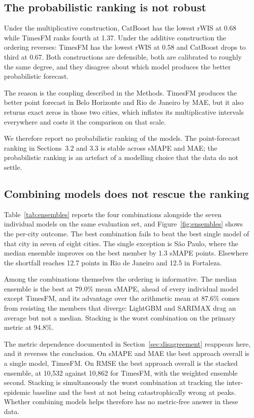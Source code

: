 \documentclass[11pt]{article}
\begin{document}
\subsection{The probabilistic ranking is not robust}

Under the multiplicative construction, CatBoost has the lowest rWIS at 0.68 while TimesFM
ranks fourth at 1.37. Under the additive construction the ordering reverses: TimesFM has
the lowest rWIS at 0.58 and CatBoost drops to third at 0.67. Both constructions are
defensible, both are calibrated to roughly the same degree, and they disagree about which
model produces the better probabilistic forecast.

The reason is the coupling described in the Methods. TimesFM produces the better point
forecast in Belo Horizonte and Rio de Janeiro by MAE, but it also returns exact zeros in
those two cities, which inflates its multiplicative intervals everywhere and costs it the
comparison on that scale.

We therefore report no probabilistic ranking of the models. The point-forecast ranking in
Sections~3.2 and 3.3 is stable across sMAPE and MAE; the probabilistic ranking is an
artefact of a modelling choice that the data do not settle.

\subsection{Combining models does not rescue the ranking}
\label{sec:ensembles}

Table~\ref{tab:ensembles} reports the four combinations alongside the seven individual
models on the same evaluation set, and Figure~\ref{fig:ensembles} shows the per-city
outcome. The best combination fails to beat the best single model of that city in seven of
eight cities. The single exception is S\~ao Paulo, where the median ensemble improves on
the best member by 1.3 sMAPE points. Elsewhere the shortfall reaches 12.7 points in Rio de
Janeiro and 12.5 in Fortaleza.

Among the combinations themselves the ordering is informative. The median ensemble is the
best at 79.0\% mean sMAPE, ahead of every individual model except TimesFM, and its
advantage over the arithmetic mean at 87.6\% comes from resisting the members that
diverge: LightGBM and SARIMAX drag an average but not a median. Stacking is the worst
combination on the primary metric at 94.8\%.

The metric dependence documented in Section~\ref{sec:disagreement} reappears here, and it
reverses the conclusion. On sMAPE and MAE the best approach overall is a single model,
TimesFM. On RMSE the best approach overall is the stacked ensemble, at 10{,}532 against
10{,}862 for TimesFM, with the weighted ensemble second. Stacking is simultaneously the
worst combination at tracking the inter-epidemic baseline and the best at not being
catastrophically wrong at peaks. Whether combining models helps therefore has no
metric-free answer in these data.
\end{document}
